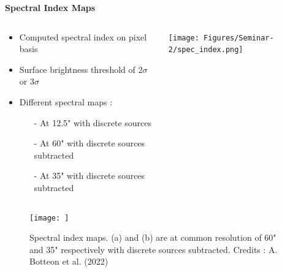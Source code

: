 \documentclass[aspectratio=169]{beamer}
\begin{document}
\begin{markdown}
\begin{frame}{\huge{\textbf{Spectral Index Maps}}}

\begin{columns}
    \begin{column}{0.6\textwidth} 
         \begin{itemize}
             \item Computed spectral index on pixel basis $^{\*}$
             \item Surface brightness threshold of $2\sigma$ or $3\sigma$ 
             \item Different spectral maps :
                \begin{itemize}
                    \item[-] At 12.5" with discrete sources
                    \item[-] At 60" with discrete sources subtracted
                    \item[-] At 35" with discrete sources subtracted $^{\*}$
                \end{itemize} 
        \end{itemize}
    \end{column}
    \begin{column}{0.45\textwidth}
    \begin{center}
        \texttt{[image: Figures/Seminar-2/spec\_index.png]}
    \end{center}
    \end{column}
\end{columns}

\end{frame}


\begin{frame}[plain]



\begin{figure}
    \centering
    \texttt{[image: ]}
    \vspace{71mm}
    \caption{Spectral index maps. (a) and (b) are at common resolution of 60" and 35" respectively with discrete sources subtracted. Credits : A. Botteon et al. (2022)}
    \label{}
\end{figure}
    

\end{frame}
\end{markdown}
\end{document}
